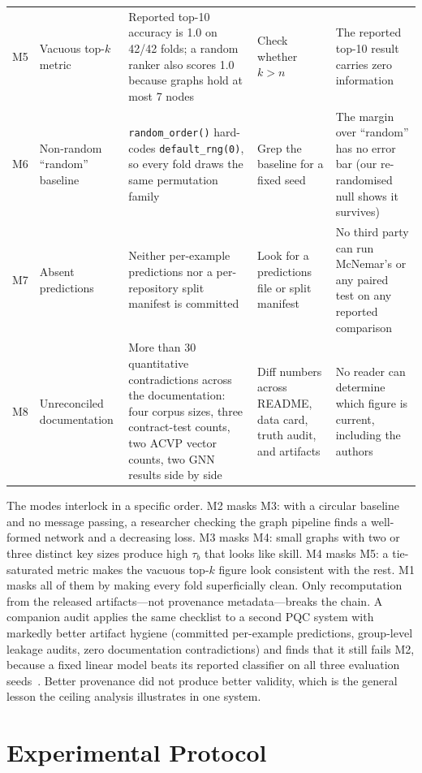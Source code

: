 \documentclass[conference,10pt]{IEEEtran}
\newcommand{\tb}{\tau_b}
\begin{document}
\begin{table}[t]
\begin{tabular}{@{}>{\raggedright\arraybackslash}p{0.7cm}>{\raggedright\arraybackslash}p{2.5cm}>{\raggedright\arraybackslash}p{3.3cm}>{\raggedright\arraybackslash}p{3.6cm}>{\raggedright\arraybackslash}p{3.75cm}@{}}
\addlinespace
M5 & Vacuous top-$k$ metric &
Reported top-10 accuracy is 1.0 on 42/42 folds; a random ranker also scores 1.0 because graphs
hold at most 7 nodes &
Check whether $k>n$ &
The reported top-10 result carries zero information \\
\addlinespace
M6 & Non-random ``random'' baseline &
\texttt{random\_order()} hard-codes \texttt{default\_rng(0)}, so every fold draws the same
permutation family &
Grep the baseline for a fixed seed &
The margin over ``random'' has no error bar (our re-randomised null shows it survives) \\
\addlinespace
M7 & Absent predictions &
Neither per-example predictions nor a per-repository split manifest is committed &
Look for a predictions file or split manifest &
No third party can run McNemar's or any paired test on any reported comparison \\
\addlinespace
M8 & Unreconciled documentation &
More than 30 quantitative contradictions across the documentation: four corpus sizes, three
contract-test counts, two ACVP vector counts, two GNN results side by side &
Diff numbers across README, data card, truth audit, and artifacts &
No reader can determine which figure is current, including the authors \\
\bottomrule
\end{tabular}
\end{table}

The modes interlock in a specific order. M2 masks M3: with a circular baseline and no message
passing, a researcher checking the graph pipeline finds a well-formed network and a decreasing
loss. M3 masks M4: small graphs with two or three distinct key sizes produce high $\tb$ that
looks like skill. M4 masks M5: a tie-saturated metric makes the vacuous top-$k$ figure look
consistent with the rest. M1 masks all of them by making every fold superficially clean. Only
recomputation from the released artifacts---not provenance metadata---breaks the chain. A
companion audit applies the same checklist to a second PQC system with markedly better artifact
hygiene (committed per-example predictions, group-level leakage audits, zero documentation
contradictions) and finds that it still fails M2, because a fixed linear model beats its
reported classifier on all three evaluation seeds~\cite{qtrust_validity_audit}. Better
provenance did not produce better validity, which is the general lesson the ceiling analysis
illustrates in one system.

\section{Experimental Protocol}
\label{sec:protocol}
\end{document}
